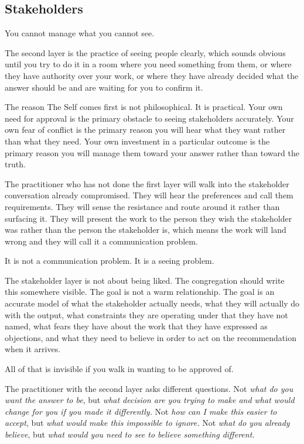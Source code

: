 \subsection*{Stakeholders}

You cannot manage what you cannot see.

The second layer is the practice of seeing people clearly, which sounds obvious until you try to do it in a room where you need something from them, or where they have authority over your work, or where they have already decided what the answer should be and are waiting for you to confirm it.

The reason The Self comes first is not philosophical. It is practical. Your own need for approval is the primary obstacle to seeing stakeholders accurately. Your own fear of conflict is the primary reason you will hear what they want rather than what they need. Your own investment in a particular outcome is the primary reason you will manage them toward your answer rather than toward the truth.

The practitioner who has not done the first layer will walk into the stakeholder conversation already compromised. They will hear the preferences and call them requirements. They will sense the resistance and route around it rather than surfacing it. They will present the work to the person they wish the stakeholder was rather than the person the stakeholder is, which means the work will land wrong and they will call it a communication problem.

It is not a communication problem. It is a seeing problem.

The stakeholder layer is not about being liked. The congregation should write this somewhere visible. The goal is not a warm relationship. The goal is an accurate model of what the stakeholder actually needs, what they will actually do with the output, what constraints they are operating under that they have not named, what fears they have about the work that they have expressed as objections, and what they need to believe in order to act on the recommendation when it arrives.

All of that is invisible if you walk in wanting to be approved of.

The practitioner with the second layer asks different questions. Not \textit{what do you want the answer to be}, but \textit{what decision are you trying to make and what would change for you if you made it differently.} Not \textit{how can I make this easier to accept}, but \textit{what would make this impossible to ignore.} Not \textit{what do you already believe}, but \textit{what would you need to see to believe something different.}

